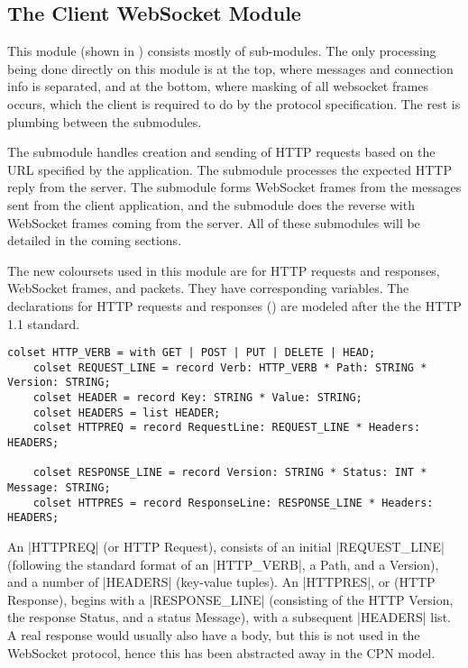 \subsection{The Client WebSocket Module}\label{sec:client_ws}


	This module (shown in ) consists mostly of sub-modules.
	The only processing being done directly on this module is at the top, where
	messages and connection info is separated, and at the bottom, where
	masking of all websocket frames occurs, which the client is required to do by
	the protocol specification. The rest is plumbing between the submodules. 
	
	The  submodule handles creation and sending of
	HTTP requests based on the URL specified by the application. The 
	 submodule processes the expected HTTP reply from
	the server. The  submodule forms WebSocket frames from
	the messages sent from the client application, and the  submodule does the reverse with WebSocket frames coming from the
	server. All of these submodules will be detailed in the coming sections.
	
	The new coloursets used in this module are for HTTP requests and responses,
	WebSocket frames, and packets. They have corresponding variables. The
	declarations for HTTP requests and responses ()
	are modeled after the  the HTTP 1.1 standard.
	
	\begin{lstlisting}[label=lst:client_lib_colset_http,caption=HTTP colour
	sets,gobble=1,float=h]
	colset HTTP_VERB = with GET | POST | PUT | DELETE | HEAD;
	colset REQUEST_LINE = record Verb: HTTP_VERB * Path: STRING * Version: STRING;
	colset HEADER = record Key: STRING * Value: STRING;
	colset HEADERS = list HEADER;
	colset HTTPREQ = record RequestLine: REQUEST_LINE *	Headers: HEADERS;
	
	colset RESPONSE_LINE = record Version: STRING * Status: INT * Message: STRING;
	colset HTTPRES = record ResponseLine: RESPONSE_LINE * Headers: HEADERS;
	\end{lstlisting}
	 
	An |HTTPREQ| (or HTTP Request),	consists of an initial |REQUEST_LINE|
	(following the standard format of an |HTTP_VERB|, a Path, and a Version), and
	a number of |HEADERS| (key-value tuples). An |HTTPRES|, or (HTTP Response),
	begins with a |RESPONSE_LINE| (consisting of the HTTP Version, the response
	Status, and a status Message), with a subsequent |HEADERS| list. A real
	response would usually also have a body, but this is not used in the
	WebSocket protocol, hence this has been abstracted away in the CPN model.
	
